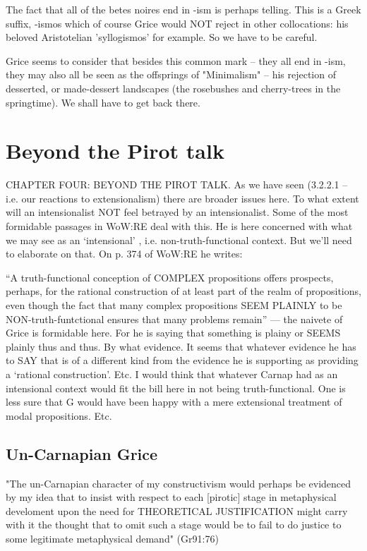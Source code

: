 \documentclass[10pt,titlepage]{book}
\begin{document}
The fact that all  of the betes noires end in -ism is perhaps telling. This 
is a Greek suffix,  -ismos which of course Grice would NOT reject in other 
collocations: his beloved  Aristotelian 'syllogismos' for example. So we 
have to be  careful.
 
Grice seems to  consider that besides this common mark -- they all end in 
-ism, they may also  all be seen as the offsprings of "Minimalism" -- his 
rejection of desserted, or  made-dessert landscapes (the rosebushes and 
cherry-trees in the springtime). We  shall have to get back there.
 
\section{Beyond the Pirot talk}

CHAPTER  FOUR: BEYOND THE PIROT TALK.
As  we have seen (3.2.2.1 – i.e. our reactions to extensionalism) there are 
broader  issues here. To what extent will an intensionalist NOT feel 
betrayed by an  intensionalist. Some of the most formidable passages in WoW:RE 
deal with this.  He is here concerned with what we may see as an ‘intensional’
, i.e.  non-truth-functional context. But we’ll need to elaborate on that. 
On p. 374 of  WoW:RE he writes:

“A truth-functional conception of COMPLEX propositions  offers prospects, 
perhaps, for the rational construction of at least part of the  realm of 
propositions, even though the fact that many complex propositions SEEM  PLAINLY 
to be NON-truth-funtctional ensures that many problems  remain” 
---  the naivete of Grice is formidable here. For he is saying that 
something is  plainy or SEEMS plainly thus and thus. By what evidence. It seems 
that whatever  evidence he has to SAY that is of a different kind from the 
evidence he is  supporting as providing a ‘rational construction’. Etc. I would 
think that  whatever Carnap had as an intensional context would fit the 
bill here in not  being truth-functional. One is less sure that G would have 
been happy with a  mere extensional treatment of modal propositions.  Etc.
 
\subsection{Un-Carnapian Grice}

"The un-Carnapian character of my
constructivism would perhaps  be
evidenced by my idea that to insist
with respect to each [pirotic]  stage
in metaphysical develoment
upon the need for
THEORETICAL  JUSTIFICATION
might carry with it the thought
that to omit such a  stage
would be to fail to do justice
to some legitimate
metaphysical  demand"
    (Gr91:76)
 
\end{document}
